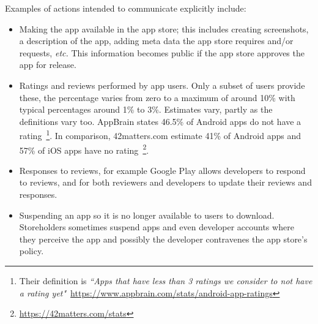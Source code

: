 Examples of actions intended to communicate explicitly include:
\begin{itemize}
    \item Making the app available in the app store; this includes creating screenshots, a description of the app, adding meta data the app store requires and/or requests, \emph{etc.} This information becomes public if the app store approves the app for release.
    \item Ratings and reviews performed by app users. Only a subset of users provide these, the percentage varies from zero to a maximum of around 10\% with typical percentages around 1\% to 3\%. %
    Estimates vary, partly as the definitions vary too. AppBrain states 46.5\% of Android apps do not have a rating~\footnote{Their definition is \emph{``Apps that have less than 3 ratings we consider to not have a rating yet"}~\url{https://www.appbrain.com/stats/android-app-ratings}}. In comparison, 42matters.com estimate 41\% of Android apps and 57\% of iOS apps have no rating~\footnote{\url{https://42matters.com/stats}}.
    \item Responses to reviews, for example Google Play allows developers to respond to reviews, and for both reviewers and developers to update their reviews and responses.
    \item Suspending an app so it is no longer available to users to download. Storeholders sometimes suspend apps and even developer accounts where they perceive the app and possibly the developer contravenes the app store's policy. %
    
\end{itemize}
% 


